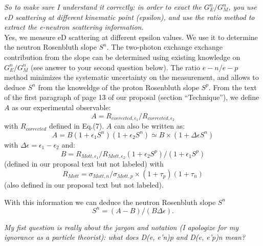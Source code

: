 \documentclass[11pt]{article}
\begin{document}
{\em So to make sure I understand it correctly: in order to exact the $G_E^n/G_M^n$, you use eD scattering at different kinematic point (epsilon), and use the ratio method to extract the e-neutron scattering information.} \\

Yes, we measure eD scattering at different epsilon values. We use it to determine the neutron Rosenbluth slope $S^n$.
The two-photon exchange exchange contribution from the slope can be determined using 
existing knowledge on $G_E^n/G_M^n$ (see answer to your second question below).
The ratio $e-n/e-p$ method minimizes the systematic uncertainty on the measurement, and allows to deduce $S^n$ from the knoweldge of the proton Rosenbluth slope $S^p$.
From the text of the first paragraph of page 13 of our proposal (section ``Technique''), we define $A$ as our experimental observable:
\begin{equation}
  A = R_{corrected, \epsilon_1}/R_{corrected, \epsilon_2}
\end{equation}
with $R_{corrected}$ defined in Eq.(7).
$A$ can also be written as:
\begin{equation}
  A = B (1 + \epsilon_1 S^n)(1 + \epsilon_2 S^n) \simeq B \times (1 + \Delta \epsilon S^n )
\end{equation}
with $\Delta \epsilon = \epsilon_1-\epsilon_2$ and:
\begin{equation}
  B = R_{Mott, \epsilon_1}/R_{Mott, \epsilon_2} (1 + \epsilon_2 S^p )/(1 + \epsilon_1 S^p )
\end{equation}
(defined in our proposal text but not labeled) with
\begin{equation}
  R_{Mott} = \sigma_{Mott, n}/\sigma_{Mott, p} \times (1+\tau_p)(1+\tau_n)
\end{equation}
(also defined in our proposal text but not labeled).

With this information we can deduce the neutron Rosenbluth slope $S^n$
\begin{equation}
  S^n = (A-B)/(B \Delta \epsilon).%
\end{equation}

{\em My fist question is really about the jargon and notation (I apologize for my ignorance as a particle theorist): what does D(e, e'n)p and D(e, e'p)n mean?}\\
\end{document}
